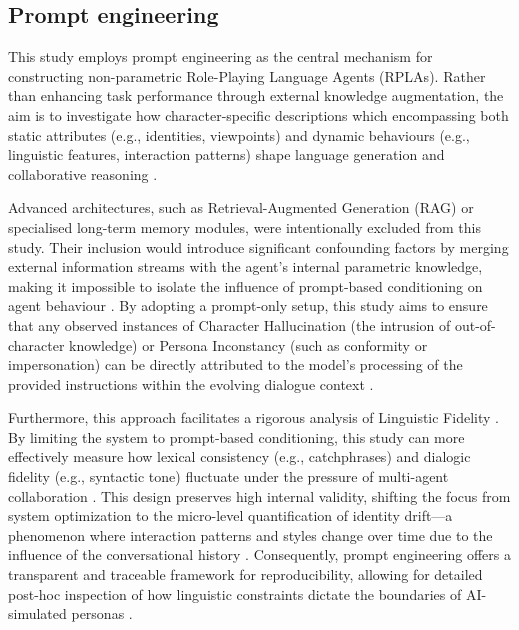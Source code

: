 \documentclass{article}
\begin{document}
\subsection{Prompt engineering}

This study employs prompt engineering as the central mechanism for constructing non-parametric Role-Playing Language Agents (RPLAs). Rather than enhancing task performance through external knowledge augmentation, the aim is to investigate how character-specific descriptions which encompassing both static attributes (e.g., identities, viewpoints) and dynamic behaviours (e.g., linguistic features, interaction patterns) shape language generation and collaborative reasoning \citep{zhou2023characterglm, chen2024review}. 

Advanced architectures, such as Retrieval-Augmented Generation (RAG) or specialised long-term memory modules, were intentionally excluded from this study. Their inclusion would introduce significant confounding factors by merging external information streams with the agent's internal parametric knowledge, making it impossible to isolate the influence of prompt-based conditioning on agent behaviour \citep{liu2023dynamic, guo2024review, xi2025review}. By adopting a prompt-only setup, this study aims to ensure that any observed instances of Character Hallucination (the intrusion of out-of-character knowledge) or Persona Inconstancy (such as conformity or impersonation) can be directly attributed to the model's processing of the provided instructions within the evolving dialogue context \citep{shao2023characterllm, baltaji2024cultured, chen2024review}.

Furthermore, this approach facilitates a rigorous analysis of Linguistic Fidelity \citep{wang2024rolellm}. By limiting the system to prompt-based conditioning, this study can more effectively measure how lexical consistency (e.g., catchphrases) and dialogic fidelity (e.g., syntactic tone) fluctuate under the pressure of multi-agent collaboration \citep{wang2024rolellm, ji2025enhancing}. This design preserves high internal validity, shifting the focus from system optimization to the micro-level quantification of identity drift—a phenomenon where interaction patterns and styles change over time due to the influence of the conversational history \cite{choi2024examining}. Consequently, prompt engineering offers a transparent and traceable framework for reproducibility, allowing for detailed post-hoc inspection of how linguistic constraints dictate the boundaries of AI-simulated personas \citep{delima2025detective}.
\end{document}
